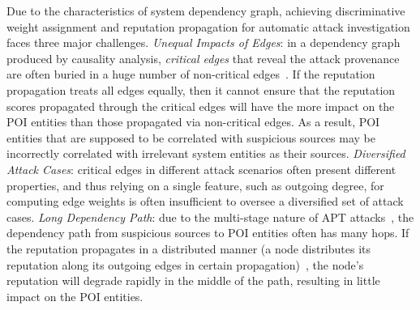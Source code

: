 Due to the characteristics of system dependency graph,
achieving discriminative weight assignment and reputation propagation for automatic attack investigation faces three major challenges.
%
\emph{Unequal Impacts of Edges}: in a dependency graph produced by causality analysis, \emph{critical edges} that reveal the attack provenance are often buried in a huge number of non-critical edges~\cite{backtracking,backtracking2,beep,liu2018priotracker}. 
If the reputation propagation treats all edges equally, then it cannot ensure that the reputation scores propagated through the critical edges will have the more impact on the POI entities than those propagated via non-critical edges. 
As a result, POI entities that are supposed to be correlated with suspicious sources may be incorrectly correlated with irrelevant system entities as their sources.
%
\emph{Diversified Attack Cases}: critical edges in different attack scenarios often present different properties, and thus relying on a single feature, such as outgoing degree, for computing edge weights is often insufficient to oversee a diversified set of attack cases.
%
\emph{Long Dependency Path}: due to the multi-stage nature of APT attacks~\cite{fireeye:anatomy,aptsymantec}, the dependency path from suspicious sources to POI entities often has many hops. If the reputation propagates in a distributed manner (\ie a node distributes its reputation along its outgoing edges in certain propagation)~\cite{Page:techreport:1998,cao2012sybilrank}, the node's reputation will degrade rapidly in the middle of the path, resulting in little impact on the POI entities. 

